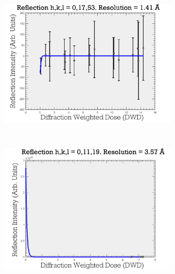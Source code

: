 \begin{figure}
        \centering
        \begin{subfigure}[b]{0.9\textwidth}
                \centering
                \includegraphics[width=\textwidth]{figures/zde/ReflectionPlot_h,k,l_0,17,53_fit_to_small_values.pdf}
                \caption{}
                \label{fig:Data overfitting to small values - Extrapolation method}
        \end{subfigure}
				\\
        \begin{subfigure}[b]{0.9\textwidth}
                \centering
                \includegraphics[width=\textwidth]{figures/zde/ReflectionPlot_h,k,l_0,11,19_zero_dose_too_high.pdf}
                \caption{}
                \label{fig:Unphysically high zero-dose intensity - Extrapolation method}

\end{subfigure}
\end{figure}
